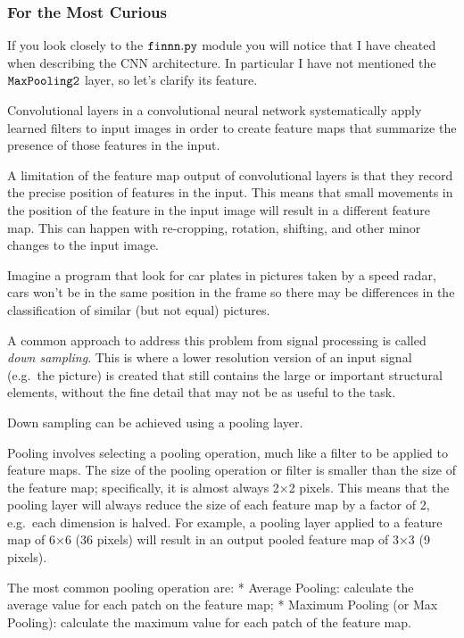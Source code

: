 \begin{tcolorbox}[breakable, size=fbox, boxrule=1pt, pad at break*=1mm, colframe=cellborder, colback=cream]
\subsubsection{For the Most Curious}\label{for-the-most-curious}

If you look closely to the \(\tt{finnn.py}\) module you will notice that
I have cheated when describing the CNN architecture. In particular I
have not mentioned the \(\tt{MaxPooling2}\) layer, so let's clarify its
feature.

Convolutional layers in a convolutional neural network systematically
apply learned filters to input images in order to create feature maps
that summarize the presence of those features in the input.

A limitation of the feature map output of convolutional layers is that
they record the precise position of features in the input. This means
that small movements in the position of the feature in the input image
will result in a different feature map. This can happen with
re-cropping, rotation, shifting, and other minor changes to the input
image.

Imagine a program that look for car plates in pictures taken by a speed
radar, cars won't be in the same position in the frame so there may be
differences in the classification of similar (but not equal) pictures.

A common approach to address this problem from signal processing is
called \emph{down sampling}. This is where a lower resolution version of
an input signal (e.g.~the picture) is created that still contains the
large or important structural elements, without the fine detail that may
not be as useful to the task.

Down sampling can be achieved using a pooling layer.

Pooling involves selecting a pooling operation, much like a filter to be
applied to feature maps. The size of the pooling operation or filter is
smaller than the size of the feature map; specifically, it is almost
always 2×2 pixels. This means that the pooling layer will always reduce
the size of each feature map by a factor of 2, e.g.~each dimension is
halved. For example, a pooling layer applied to a feature map of 6×6 (36
pixels) will result in an output pooled feature map of 3×3 (9 pixels).

The most common pooling operation are: * Average Pooling: calculate the
average value for each patch on the feature map; * Maximum Pooling (or
Max Pooling): calculate the maximum value for each patch of the feature
map.
\end{tcolorbox}

